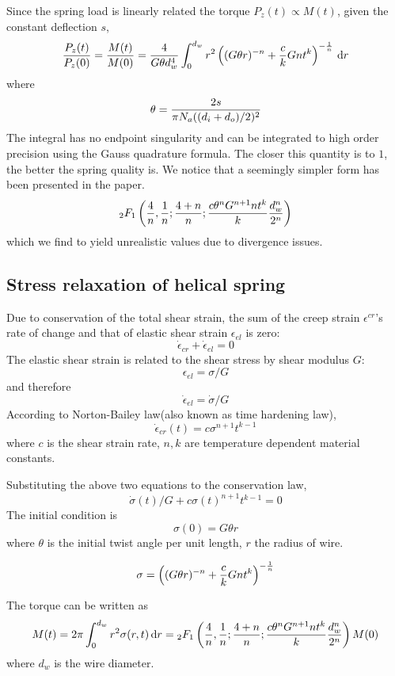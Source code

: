 \documentclass[10pt]{article}
\begin{document}
Since the spring load is linearly related the torque $P_z(t)\propto M(t)$, given the constant deflection $s$,
\[
{P_z(t)\over P_z(0)} = {M(t)\over M(0)} = {4\over G\theta d_w^4}\int_0^{d_w} r^2 \left( (G\theta r)^{-n} + {c\over k} Gnt^k \right)^{-{1\over n}} \,\mathrm{d} r
\]
where
\[
\theta = {2s\over \pi N_a ((d_i+d_o)/2)^2}
\]
The integral has no endpoint singularity and can be integrated to high order precision using the Gauss quadrature formula. The closer this quantity is to $1$, the better the spring quality is. We notice that a seemingly simpler form has been presented in the paper.
\[
{}_{2}F_1 \left( {4\over n},{1\over n};{4+n\over n};{c\theta^n G^{n+1} n t^k\over k} {d_w^n\over 2^n}\right)
\]
which we find to yield unrealistic values due to divergence issues.

\subsection{Stress relaxation of helical spring}
\label{sec:Relaxation}

Due to conservation of the total shear strain, the sum of the creep strain $\epsilon^{cr}$'s rate of change and that of elastic shear strain $\epsilon_{el}$ is zero:
\[
\dot{\epsilon}_{cr} + \dot{\epsilon}_{el} = 0
\]
The elastic shear strain is related to the shear stress by shear modulus $G$:
\[
\epsilon_{el} = \sigma/G
\]
and therefore
\[
\dot{\epsilon}_{el} = \dot{\sigma}/G
\]
According to Norton-Bailey law(also known as time hardening law),
\begin{equation} \label{eq:N-B}
\dot{\epsilon}_{cr}(t)=c\sigma^{n+1} t^{k-1}
\end{equation}
where $c$ is the shear strain rate, $n,k$ are temperature dependent material constants.

Substituting the above two equations to the conservation law,
\begin{equation} \label{eq:diff}
\dot{\sigma}(t)/G+c\sigma(t)^{n+1} t^{k-1}=0
\end{equation}
The initial condition is
\[
\sigma (0) = G\theta r
\]
where $\theta$ is the initial twist angle per unit length, $r$ the radius of wire.

\[
\sigma = \left( (G\theta r)^{-n} + {c\over k} Gnt^k \right)^{-{1\over n}}
\]

The torque can be written as
\[
M(t) = 2\pi \int_0^{d_w} r^2 \sigma(r,t)\,\mathrm{d} r ={}_{2}F_1 \left( {4\over n},{1\over n};{4+n\over n};{c\theta^n G^{n+1} n t^k\over k} {d_w^n\over 2^n}\right) M(0)
\]
where $d_w$ is the wire diameter.
\end{document}
